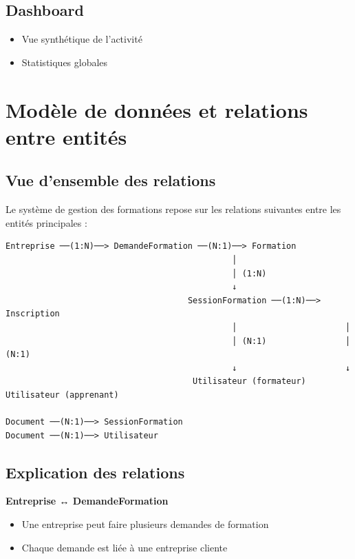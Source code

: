 \documentclass[a4paper,12pt]{article}
\begin{document}
\subsection{Dashboard}
\begin{itemize}
    \item Vue synthétique de l'activité
    \item Statistiques globales
\end{itemize}

\section{Modèle de données et relations entre entités}

\subsection{Vue d'ensemble des relations}

Le système de gestion des formations repose sur les relations suivantes entre les entités principales :

\begin{verbatim}
Entreprise ──(1:N)──> DemandeFormation ──(N:1)──> Formation
                                              │
                                              │ (1:N)
                                              ↓
                                     SessionFormation ──(1:N)──> Inscription
                                              │                      │
                                              │ (N:1)                │ (N:1)
                                              ↓                      ↓
                                      Utilisateur (formateur)   Utilisateur (apprenant)

Document ──(N:1)──> SessionFormation
Document ──(N:1)──> Utilisateur
\end{verbatim}

\subsection{Explication des relations}

\textbf{Entreprise ↔ DemandeFormation}
\begin{itemize}
    \item Une entreprise peut faire plusieurs demandes de formation
    \item Chaque demande est liée à une entreprise cliente
\end{itemize}
\end{document}
